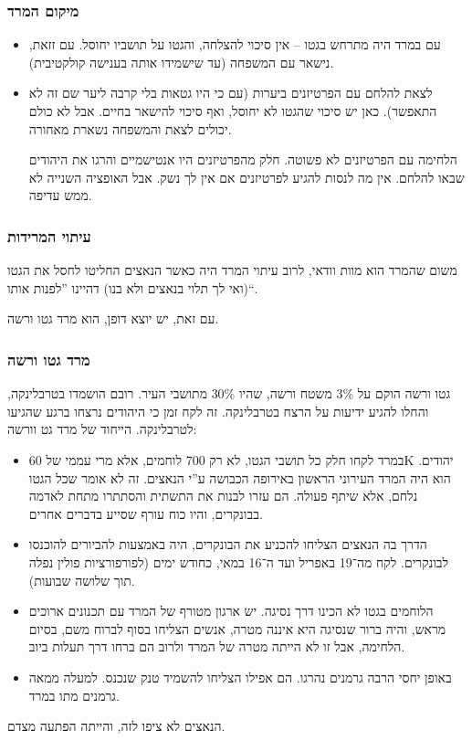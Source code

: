 \documentclass[]{article}
\begin{document}
	\subsubsection*{מיקום המרד}
	\begin{itemize}
		\item עם במרד היה מתרחש בגטו – אין סיכוי להצלחה, והגטו על תושביו יחוסל. עם זזאת, נישאר עם המשפחה (עד שישמידו אותה בענישה קולקטיבית). 
		\item לצאת להלחם עם הפרטיזנים ביערות (עם כי היו גטאות בלי קרבה ליער שם זה לא התאפשר). כאן יש סיכוי שהגטו לא יחוסל, ואף סיכוי להישאר בחיים. אבל לא כולם יכולים לצאת והמשפחה נשארת מאחורה. 
		
		הלחימה עם הפרטיזנים לא פשוטה. חלק מהפרטיזנים היו אנטישמיים והרגו את היהודים שבאו להלחם. אין מה לנסות להגיע לפרטיזנים אם אין לך נשק. אבל האופציה השנייה לא ממש עדיפה. 
	\end{itemize}
	
	\subsubsection*{עיתוי המרידות}
	משום שהמרד הוא מוות וודאי, לרוב עיתוי המרד היה כאשר הנאצים החליטו לחסל את הגטו (ואי לך תלוי בנאצים ולא בנו) דהיינו ''לפנות אותו``. 
	
	עם זאת, יש יוצא דופן, הוא מרד גטו ורשה. 
	
	\subsubsection*{מרד גטו ורשה}
	גטו ורשה הוקם על 3\% משטח ורשה, שהיו 30\% מתושבי העיר. רובם הושמדו בטרבלינקה, והחלו להגיע ידיעות על הרצח בטרבלינקה. זה לקח זמן כי היהודים נרצחו ברגע שהגיעו לטרבלינקה. הייחוד של מרד גט וורשה: 
	\begin{itemize}
		\item במרד לקחו חלק כל תושבי הגטו, לא רק 700 לוחמים, אלא מרי עממי של 60K יהודים. הוא היה המרד העירוני הראשון באירופה הכבושה ע''י הנאצים. זה לא אומר שכל הגטו נלחם, אלא שיתף פעולה. הם עזרו לבנות את התשתית והסתתרו מתחת לאדמה בבונקרים, והיו כוח עורף שסייע בדברים אחרים. 
		\item הדרך בה הנאצים הצליחו להכניע את הבונקרים, היה באמצעות להביורים להוכנסו לבונקרים. לקח מה־19 באפריל ועד ה־16 במאי, כחודש ימים (לפורפורציות פולין נפלה תוך שלושה שבועות). 
		\item הלוחמים בגטו לא הכינו דרך נסיגה. יש ארגון מטורף של המרד עם תכנונים ארוכים מראש, והיה ברור שנסיגה היא איננה מטרה, אנשים הצליחו בסוף לברוח משם, בסיום הלחימה, אבל זו לא הייתה מטרה של המרד ולרוב הם ברחו דרך תעלות ביוב. 
		\item באופן יחסי הרבה גרמנים נהרגו. הם אפילו הצליחו להשמיד טנק שנכנס. למעלה ממאה גרמנים מתו במרד. 
	\end{itemize}
	הנאצים לא ציפו לזה, והייתה הפתעה מצדם. 
	
\end{document}

